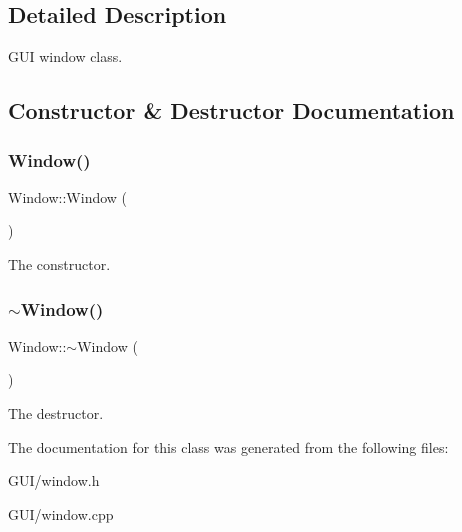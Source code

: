 \subsection{Detailed Description}
G\+UI window class. 

\subsection{Constructor \& Destructor Documentation}
\mbox{\label{classWindow_a74e6087da23d3c24e9fac0245e5ec92c}} 
\subsubsection{\texorpdfstring{Window()}{Window()}}
{\footnotesize\ttfamily Window\+::\+Window (\begin{DoxyParamCaption}{ }\end{DoxyParamCaption})}

The constructor. \mbox{\label{classWindow_a245d821e6016fa1f6970ccbbedd635f6}} 
\subsubsection{\texorpdfstring{$\sim$\+Window()}{~Window()}}
{\footnotesize\ttfamily Window\+::$\sim$\+Window (\begin{DoxyParamCaption}{ }\end{DoxyParamCaption})}

The destructor. 

The documentation for this class was generated from the following files\+:\begin{DoxyCompactItemize}
\item 
G\+U\+I/window.\+h\item 
G\+U\+I/window.\+cpp\end{DoxyCompactItemize}
